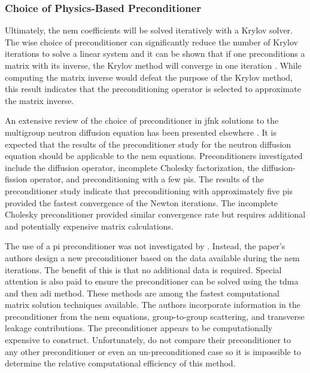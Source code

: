    \subsubsection{Choice of Physics-Based Preconditioner}
      Ultimately, the \gls{nem} coefficients will be solved iteratively with a
      Krylov solver. The wise choice of preconditioner can significantly reduce 
      the number of Krylov iterations to solve a linear system and it can be
      shown that if one preconditions a matrix with its inverse, the Krylov
      method will converge in one iteration \cite{textbookkelley}. While
      computing the matrix inverse would defeat the purpose of the Krylov
      method, this result indicates that the preconditioning operator is
      selected to approximate the matrix inverse.

      An extensive review of the choice of preconditioner in \gls{jfnk}
      solutions to the multigroup neutron diffusion equation has been presented
      elsewhere \cite{gill_azmy}. It is expected that the results of the
      preconditioner study for the neutron diffusion equation should be
      applicable to the \gls{nem} equations. Preconditioners investigated
      include the diffusion operator, incomplete Cholesky factorization, the
      diffusion-fission operator, and preconditioning with a few \glspl{pi}.
      The results of the preconditioner study indicate that preconditioning with
      approximately five \glspl{pi} provided the fastest convergence of the
      Newton iterations. The incomplete Cholesky preconditioner provided similar
      convergence rate but requires additional and potentially expensive matrix
      calculations.

      The use of a \gls{pi} preconditioner was not investigated by
      \citeauthor{qe2paper}. Instead, the paper's authors design a new
      preconditioner based on the data available during the \gls{nem}
      iterations. The benefit of this is that no additional data is required.
      Special attention is also paid to ensure the preconditioner can be solved
      using the \gls{tdma} and then \gls{adi} method. These methods are among
      the fastest computational matrix solution techniques available. The
      authors incorporate information in the preconditioner from the \gls{nem}
      equations, group-to-group scattering, and transverse leakage
      contributions. The preconditioner appears to be computationally expensive
      to construct. Unfortunately, \citeauthor{qe2paper} do not compare their 
      preconditioner to any other preconditioner or even an un-preconditioned
      case so it is impossible to determine the relative computational
      efficiency of this method.

